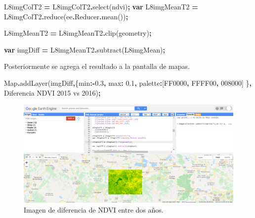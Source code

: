 \documentclass[
  12pt,
  letterpaper,
  twoside]{book}
\newenvironment{Shaded}{\begin{snugshade}}{\end{snugshade}}
\newcommand{\AttributeTok}[1]{\textcolor[rgb]{0.77,0.63,0.00}{#1}}
\newcommand{\BuiltInTok}[1]{#1}
\newcommand{\DataTypeTok}[1]{\textcolor[rgb]{0.13,0.29,0.53}{#1}}
\newcommand{\FloatTok}[1]{\textcolor[rgb]{0.00,0.00,0.81}{#1}}
\newcommand{\FunctionTok}[1]{\textcolor[rgb]{0.00,0.00,0.00}{#1}}
\newcommand{\KeywordTok}[1]{\textcolor[rgb]{0.13,0.29,0.53}{\textbf{#1}}}
\newcommand{\NormalTok}[1]{#1}
\newcommand{\OperatorTok}[1]{\textcolor[rgb]{0.81,0.36,0.00}{\textbf{#1}}}
\newcommand{\StringTok}[1]{\textcolor[rgb]{0.31,0.60,0.02}{#1}}
\begin{document}
\begin{Shaded}
\begin{Highlighting}[]
\NormalTok{L8imgColT2 }\OperatorTok{=}\NormalTok{ L8imgColT2}\OperatorTok{.}\FunctionTok{select}\NormalTok{(}\StringTok{\textquotesingle{}ndvi\textquotesingle{}}\NormalTok{)}\OperatorTok{;}
\KeywordTok{var}\NormalTok{ L8imgMeanT2 }\OperatorTok{=}\NormalTok{ L8imgColT2}\OperatorTok{.}\FunctionTok{reduce}\NormalTok{(ee}\OperatorTok{.}\AttributeTok{Reducer}\OperatorTok{.}\FunctionTok{mean}\NormalTok{())}\OperatorTok{;}

\NormalTok{L8imgMeanT2 }\OperatorTok{=}\NormalTok{ L8imgMeanT2}\OperatorTok{.}\FunctionTok{clip}\NormalTok{(geometry)}\OperatorTok{;}

\KeywordTok{var}\NormalTok{ imgDiff }\OperatorTok{=}\NormalTok{ L8imgMeanT2}\OperatorTok{.}\FunctionTok{subtract}\NormalTok{(L8imgMean)}\OperatorTok{;}  
\end{Highlighting}
\end{Shaded}

Posteriormente se agrega el resultado a la pantalla de mapas.

\begin{Shaded}
\begin{Highlighting}[]
\BuiltInTok{Map}\OperatorTok{.}\FunctionTok{addLayer}\NormalTok{(imgDiff}\OperatorTok{,}\NormalTok{\{}\DataTypeTok{min}\OperatorTok{:{-}}\FloatTok{0.3}\OperatorTok{,} \DataTypeTok{max}\OperatorTok{:} \FloatTok{0.1}\OperatorTok{,} 
  \DataTypeTok{palette}\OperatorTok{:}\NormalTok{[}\StringTok{\textquotesingle{}FF0000\textquotesingle{}}\OperatorTok{,} \StringTok{\textquotesingle{}FFFF00\textquotesingle{}}\OperatorTok{,} \StringTok{\textquotesingle{}008000\textquotesingle{}}\NormalTok{] \}}\OperatorTok{,} 
  \StringTok{\textquotesingle{}Diferencia NDVI 2015 vs 2016\textquotesingle{}}\NormalTok{)}\OperatorTok{;}
\end{Highlighting}
\end{Shaded}

\begin{figure}

{\centering \includegraphics[width=1\linewidth]{Img/imDifNDVI} 

}

\caption{Imagen de diferencia de NDVI entre dos años.}\label{fig:unnamed-chunk-164}
\end{figure}
\end{document}
